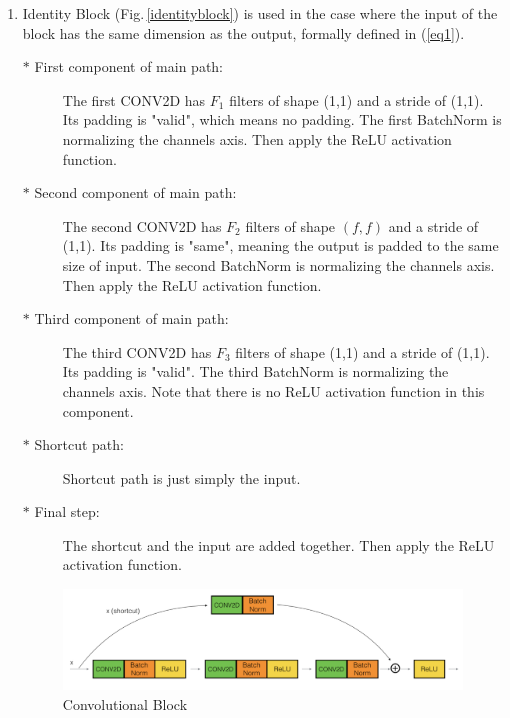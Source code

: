 \begin{enumerate}
\item  Identity Block (Fig.\,\ref{identityblock}) is used in the case where the input of the block has the same dimension as the output, formally defined in (\ref{eq1}).
    \begin{description}
      \item[$\ast$ First component of main path:] The first CONV2D has $F_1$ filters of shape (1,1) and a stride of (1,1). Its padding is "valid", which means no padding. The first BatchNorm is normalizing the channels axis. Then apply the ReLU activation function. 
      \item[$\ast$ Second component of main path:] The second CONV2D has $F_2$ filters of shape $(f,f)$ and a stride of (1,1). Its padding is "same", meaning the output is padded to the same size of input. The second BatchNorm is normalizing the channels axis. Then apply the ReLU activation function. 
      \item[$\ast$ Third component of main path:] The third CONV2D has $F_3$ filters of shape (1,1) and a stride of (1,1). Its padding is "valid". The third BatchNorm is normalizing the channels axis. Note that there is no ReLU activation function in this component.
      \item[$\ast$ Shortcut path:] Shortcut path is just simply the input.
      \item[$\ast$ Final step:] The shortcut and the input are added together. Then apply the ReLU activation function.
    \end{description}
    
\begin{figure}[h]
\centering
\includegraphics[width=\textwidth]{Figs/convolutionblock.png}
\caption{Convolutional Block \citep{resnet_implement}}
\label{convolutionblock}
\end{figure}


\end{enumerate}
